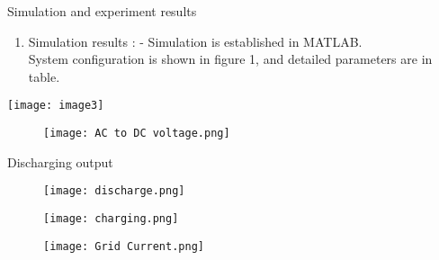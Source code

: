 \documentclass{article} %
\begin{document}
    
       

\noindent Simulation and experiment results 

\begin{enumerate}
\item  Simulation results : - Simulation is established in MATLAB.\\ System configuration is shown in figure 1, and detailed parameters  are in table. 
\end{enumerate}




\noindent 

\noindent 

\noindent \texttt{[image: image3]}\\
\begin{center}



\begin{figure}
\texttt{[image: AC to DC voltage.png]}
\end{figure}
 
 Discharging output \\
 \begin{figure}
 \texttt{[image: discharge.png]}
 \end{figure}

\begin{figure}
\texttt{[image: charging.png]}
\end{figure}

\begin{figure}
\texttt{[image: Grid Current.png]}
\end{figure}

\end{center}


 
\end{document}
